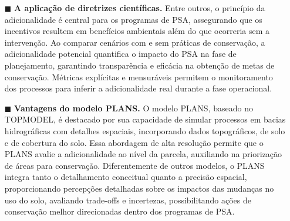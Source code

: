 \documentclass[./main.tex]{subfiles}
\begin{document}
\begin{itemize}
    \item[$\blacksquare$] \textbf{A aplicação de diretrizes científicas.} Entre outros, o princípio da adicionalidade é central para os programas de PSA, assegurando que os incentivos resultem em benefícios ambientais além do que ocorreria sem a intervenção. Ao comparar cenários com e sem práticas de conservação, a adicionalidade potencial quantifica o impacto do PSA na fase de planejamento, garantindo transparência e eficácia na obtenção de metas de conservação. Métricas explícitas e mensuráveis permitem o monitoramento dos processos para inferir a adicionalidade real durante a fase operacional.

    \item[$\blacksquare$] \textbf{Vantagens do modelo PLANS.} O modelo PLANS, baseado no TOPMODEL, é destacado por sua capacidade de simular processos em bacias hidrográficas com detalhes espaciais, incorporando dados topográficos, de solo e de cobertura do solo. Essa abordagem de alta resolução permite que o PLANS avalie a adicionalidade ao nível da parcela, auxiliando na priorização de áreas para conservação. Diferentemente de outros modelos, o PLANS integra tanto o detalhamento conceitual quanto a precisão espacial, proporcionando percepções detalhadas sobre os impactos das mudanças no uso do solo, avaliando trade-offs e incertezas, possibilitando ações de conservação melhor direcionadas dentro dos programas de PSA.
    
\end{itemize}
\end{document}
